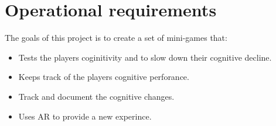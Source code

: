 
\section{Operational requirements}
The goals of this project is to create a set of mini-games that:
\begin{itemize}
	\item Tests the players coginitivity and to slow down their cognitive decline.
	\item Keeps track of the players cognitive perforance.
	\item Track and document the cognitive changes.
	\item Uses AR to provide a new experince.
\end{itemize}


